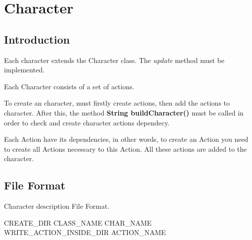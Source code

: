 \chapter{Character}

	\section{Introduction}
		Each character extends the Character class. The \emph{update} method must be implemented. 
		
		
		
	Each Character consists of a set of actions.
	
	To create an character, must firstly create actions, then add the actions to character. After this, the method \textbf{String buildCharacter()} must be called in order to check and create character actions dependecy.
	
	Each Action have its dependencies, in other words, to create an Action you need to create all Actions necessary to this Action. All these actions are added to the character.
	
	\section{File Format}
	\begin{algorithm}[H]
	    \caption{Character description File Format.}
	    \label{algoEvalCuda}
	    \begin{algorithmic}
			\STATE CREATE\_DIR
			\STATE [F][STRING] CLASS\_NAME
			\STATE [F][STRING]CHAR\_NAME
				\STATE WRITE\_ACTION\_INSIDE\_DIR
				\STATE [F][STRING]ACTION\_NAME
			\ENDFOR
		\end{algorithmic}
	\end{algorithm}
	
